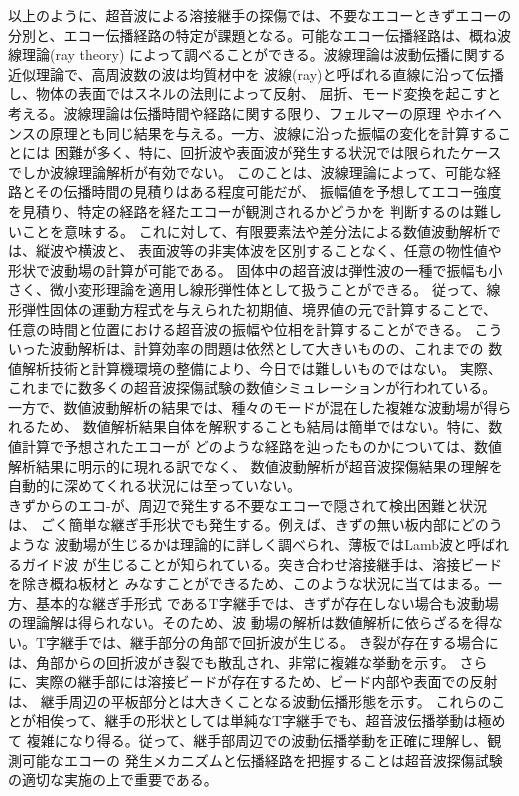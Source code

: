 %
%
以上のように、超音波による溶接継手の探傷では、不要なエコーときずエコーの
分別と、エコー伝播経路の特定が課題となる。可能なエコー伝播経路は、概ね波線理論(ray theory)
によって調べることができる。波線理論は波動伝播に関する近似理論で、高周波数の波は均質材中を
波線(ray)と呼ばれる直線に沿って伝播し、物体の表面ではスネルの法則によって反射、
屈折、モード変換を起こすと考える。波線理論は伝播時間や経路に関する限り、フェルマーの原理
やホイヘンスの原理とも同じ結果を与える。一方、波線に沿った振幅の変化を計算することには
困難が多く、特に、回折波や表面波が発生する状況では限られたケースでしか波線理論解析が有効でない。
このことは、波線理論によって、可能な経路とその伝播時間の見積りはある程度可能だが、
振幅値を予想してエコー強度を見積り、特定の経路を経たエコーが観測されるかどうかを
判断するのは難しいことを意味する。
これに対して、有限要素法や差分法による数値波動解析では、縦波や横波と、
表面波等の非実体波を区別することなく、任意の物性値や形状で波動場の計算が可能である。
固体中の超音波は弾性波の一種で振幅も小さく、微小変形理論を適用し線形弾性体として扱うことができる。
従って、線形弾性固体の運動方程式を与えられた初期値、境界値の元で計算することで、
任意の時間と位置における超音波の振幅や位相を計算することができる。
こういった波動解析は、計算効率の問題は依然として大きいものの、これまでの
数値解析技術と計算機環境の整備により、今日では難しいものではない。
実際、これまでに数多くの超音波探傷試験の数値シミュレーションが行われている。
一方で、数値波動解析の結果では、種々のモードが混在した複雑な波動場が得られるため、
数値解析結果自体を解釈することも結局は簡単ではない。特に、数値計算で予想されたエコーが
どのような経路を辿ったものかについては、数値解析結果に明示的に現れる訳でなく、
数値波動解析が超音波探傷結果の理解を自動的に深めてくれる状況には至っていない。\\

%
%
きずからのエコ-が、周辺で発生する不要なエコーで隠されて検出困難と状況は、
ごく簡単な継ぎ手形状でも発生する。例えば、きずの無い板内部にどのうような
波動場が生じるかは理論的に詳しく調べられ、薄板ではLamb波と呼ばれるガイド波
が生じることが知られている。突き合わせ溶接継手は、溶接ビードを除き概ね板材と
みなすことができるため、このような状況に当てはまる。一方、基本的な継ぎ手形式
であるT字継手では、きずが存在しない場合も波動場の理論解は得られない。そのため、波
動場の解析は数値解析に依らざるを得ない。T字継手では、継手部分の角部で回折波が生じる。
き裂が存在する場合には、角部からの回折波がき裂でも散乱され、非常に複雑な挙動を示す。
さらに、実際の継手部には溶接ビードが存在するため、ビード内部や表面での反射は、
継手周辺の平板部分とは大きくことなる波動伝播形態を示す。
これらのことが相俟って、継手の形状としては単純なT字継手でも、超音波伝播挙動は極めて
複雑になり得る。従って、継手部周辺での波動伝播挙動を正確に理解し、観測可能なエコーの
発生メカニズムと伝播経路を把握することは超音波探傷試験の適切な実施の上で重要である。
